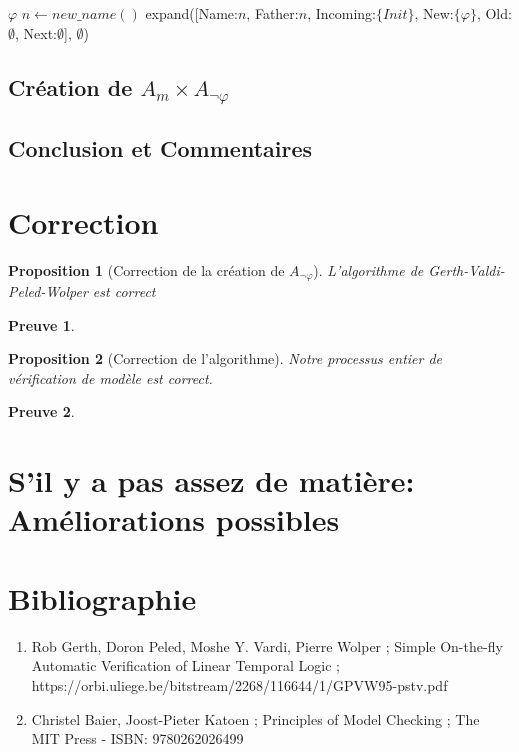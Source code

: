 \documentclass{paper}
\newtheorem{proposition}{Proposition}
\newtheorem{preuve}{Preuve}
\begin{document}
    \begin{algorithm}
    \caption{Algorithme de Gerth - Create Graph}
    \begin{algorithmic}
        \Require $\varphi$ 
        \State $n \gets new\_name()$
        \State \Return expand([Name:$n$, Father:$n$, Incoming:$\{Init\}$, New:$\{\varphi\}$, Old:$\emptyset$, Next:$\emptyset$], $\emptyset$)
    \end{algorithmic}
    \end{algorithm}


\subsection{Création de $A_m\times A_{\lnot\varphi}$}

\subsection{Conclusion et Commentaires}



\section{Correction}

\begin{proposition}[Correction de la création de $A_{\lnot\varphi}$]
    L'algorithme de Gerth-Valdi-Peled-Wolper est correct
\end{proposition}

\begin{preuve}
    
\end{preuve}

\begin{proposition}[Correction de l'algorithme]
    Notre processus entier de vérification de modèle est correct.
\end{proposition}

\begin{preuve}

\end{preuve}

\section{S'il y a pas assez de matière: Améliorations possibles}

\section{Bibliographie}
\begin{enumerate}
    \item Rob Gerth, Doron Peled, Moshe Y. Vardi, Pierre Wolper ; Simple On-the-fly Automatic Verification of Linear Temporal Logic ; https://orbi.uliege.be/bitstream/2268/116644/1/GPVW95-pstv.pdf
    \item Christel Baier, Joost-Pieter Katoen ; Principles of Model Checking ; The MIT Press - ISBN: 9780262026499
\end{enumerate}
\end{document}
